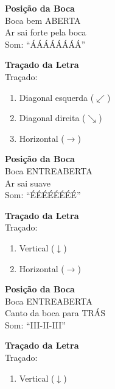 \begin{boquinha}
\begin{minipage}{0.45\textwidth}
\centering
\textbf{Posição da Boca}\\[0.5em]
Boca bem ABERTA\\
Ar sai forte pela boca\\
Som: ``ÁÁÁÁÁÁÁÁ''
\end{minipage}
\hfill
\begin{minipage}{0.45\textwidth}
\centering
\textbf{Traçado da Letra}\\[0.5em]
Traçado:
\begin{enumerate}
  \item Diagonal esquerda ($\swarrow$)
  \item Diagonal direita ($\searrow$)
  \item Horizontal ($\rightarrow$)
\end{enumerate}
\end{minipage}
\end{boquinha}

\vspace{1em}

\begin{boquinha}
\begin{minipage}{0.45\textwidth}
\centering
\textbf{Posição da Boca}\\[0.5em]
Boca ENTREABERTA\\
Ar sai suave\\
Som: ``ÉÉÉÉÉÉÉÉ''
\end{minipage}
\hfill
\begin{minipage}{0.45\textwidth}
\centering
\textbf{Traçado da Letra}\\[0.5em]
Traçado:
\begin{enumerate}
  \item Vertical ($\downarrow$)
  \item Horizontal ($\rightarrow$)
\end{enumerate}
\end{minipage}
\end{boquinha}

\vspace{1em}

\begin{boquinha}
\begin{minipage}{0.45\textwidth}
\centering
\textbf{Posição da Boca}\\[0.5em]
Boca ENTREABERTA\\
Canto da boca para TRÁS\\
Som: ``III-II-III''
\end{minipage}
\hfill
\begin{minipage}{0.45\textwidth}
\centering
\textbf{Traçado da Letra}\\[0.5em]
Traçado:
\begin{enumerate}
  \item Vertical ($\downarrow$)
\end{enumerate}
\end{minipage}
\end{boquinha}

